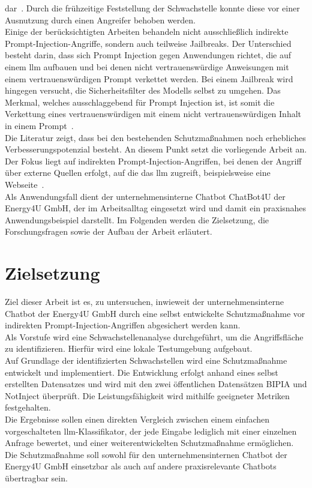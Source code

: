 dar~\cite{e06}. Durch die frühzeitige Feststellung der Schwachstelle konnte diese vor einer Ausnutzung durch einen Angreifer behoben werden. \\
Einige der berücksichtigten Arbeiten behandeln nicht ausschließlich indirekte Prompt-Injection-Angriffe, sondern auch teilweise Jailbreaks. Der Unterschied
besteht darin, dass sich Prompt Injection gegen Anwendungen richtet, die auf einem \ac{llm} aufbauen und bei denen nicht vertrauenswürdige Anweisungen mit einem 
vertrauenswürdigen Prompt verkettet werden. Bei einem Jailbreak wird hingegen versucht, die Sicherheitsfilter des Modells selbst zu umgehen. Das Merkmal, welches 
ausschlaggebend für Prompt Injection ist, ist somit die Verkettung eines vertrauenswürdigen mit einem nicht vertrauenswürdigen Inhalt in einem Prompt~\cite{e05}. \\
Die Literatur zeigt, dass bei den bestehenden Schutzmaßnahmen noch erhebliches Verbesserungspotenzial besteht. An diesem Punkt setzt die vorliegende Arbeit an. Der 
Fokus liegt auf indirekten Prompt-Injection-Angriffen, bei denen der Angriff über externe Quellen erfolgt, auf die das \ac{llm} zugreift, beispielsweise eine Webseite~\cite[2\psq]{pi6}. \\
Als Anwendungsfall dient der unternehmensinterne Chatbot ChatBot4U der Energy4U GmbH, der im Arbeitsalltag eingesetzt wird und damit ein
praxisnahes Anwendungsbeispiel darstellt. Im Folgenden werden die Zielsetzung, die Forschungsfragen sowie der Aufbau der Arbeit erläutert.

\section{Zielsetzung}

Ziel dieser Arbeit ist es, zu untersuchen, inwieweit der unternehmensinterne Chatbot der Energy4U GmbH durch eine selbst entwickelte 
Schutzmaßnahme vor indirekten Prompt-Injection-Angriffen abgesichert werden kann. \\
Als Vorstufe wird eine Schwachstellenanalyse durchgeführt, um die Angriffsfläche zu identifizieren. Hierfür wird eine lokale Testumgebung aufgebaut. \\
Auf Grundlage der identifizierten Schwachstellen wird eine Schutzmaßnahme entwickelt und implementiert. Die Entwicklung erfolgt anhand eines selbst erstellten 
Datensatzes und wird mit den zwei öffentlichen Datensätzen BIPIA und NotInject überprüft. Die Leistungsfähigkeit wird mithilfe geeigneter Metriken festgehalten. \\
Die Ergebnisse sollen einen direkten Vergleich zwischen einem einfachen vorgeschalteten \ac{llm}-Klassifikator, der jede Eingabe lediglich mit einer einzelnen Anfrage 
bewertet, und einer weiterentwickelten Schutzmaßnahme ermöglichen. Die Schutzmaßnahme soll sowohl für den unternehmensinternen Chatbot der Energy4U GmbH einsetzbar als 
auch auf andere praxisrelevante Chatbots übertragbar sein.

